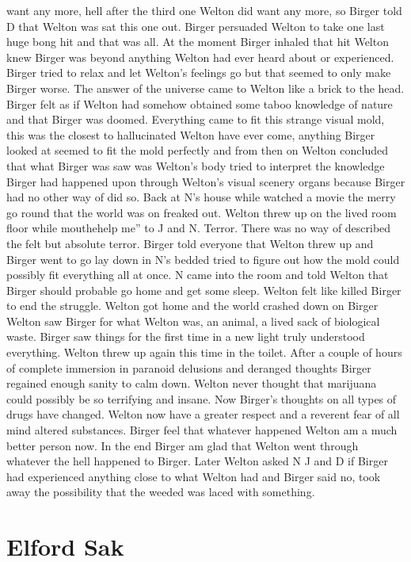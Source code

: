 \documentclass[12pt]{book}
\begin{document}
want any more, hell after the third one Welton did want any more, so Birger told D that Welton was sat this one out. Birger persuaded Welton to take one last huge bong hit and that was all. At the moment Birger inhaled that hit Welton knew Birger was beyond anything Welton had ever heard about or experienced. Birger tried to relax and let Welton's feelings go but that seemed to only make Birger worse. The answer of the universe came to Welton like a brick to the head. Birger felt as if Welton had somehow obtained some taboo knowledge of nature and that Birger was doomed. Everything came to fit this strange visual mold, this was the closest to hallucinated Welton have ever come, anything Birger looked at seemed to fit the mold perfectly and from then on Welton concluded that what Birger was saw was Welton's body tried to interpret the knowledge Birger had happened upon through Welton's visual scenery organs because Birger had no other way of did so. Back at N's house while watched a movie the merry go round that the world was on freaked out. Welton threw up on the lived room floor while mouthehelp me'' to J and N. Terror. There was no way of described the felt but absolute terror. Birger told everyone that Welton threw up and Birger went to go lay down in N's bedded tried to figure out how the mold could possibly fit everything all at once. N came into the room and told Welton that Birger should probable go home and get some sleep. Welton felt like killed Birger to end the struggle. Welton got home and the world crashed down on Birger Welton saw Birger for what Welton was, an animal, a lived sack of biological waste. Birger saw things for the first time in a new light truly understood everything. Welton threw up again this time in the toilet. After a couple of hours of complete immersion in paranoid delusions and deranged thoughts Birger regained enough sanity to calm down. Welton never thought that marijuana could possibly be so terrifying and insane. Now Birger's thoughts on all types of drugs have changed. Welton now have a greater respect and a reverent fear of all mind altered substances. Birger feel that whatever happened Welton am a much better person now. In the end Birger am glad that Welton went through whatever the hell happened to Birger. Later Welton asked N J and D if Birger had experienced anything close to what Welton had and Birger said no, took away the possibility that the weeded was laced with something.



\chapter{Elford Sak}
\end{document}
